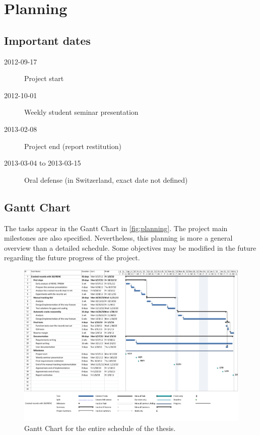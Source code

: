 \section{Planning}

\subsection{Important dates}

\begin{description}
\item[2012-09-17] Project start
\item[2012-10-01] Weekly student seminar presentation
\item[2013-02-08] Project end (report restitution)
\item[2013-03-04 to 2013-03-15] Oral defense (in Switzerland, exact date not defined)
\end{description}

\subsection{Gantt Chart}
The tasks appear in the Gantt Chart in \autoref{fig:planning}. The project main milestones are also specified. Nevertheless, this planning is more a general overview than a detailed schedule. Some objectives may be modified in the future regarding the future progress of the project.

\begin{landscape}
\begin{figure}[!h]
\centering
\includegraphics[width=0.95\linewidth]{images/planning} 
\caption{Gantt Chart for the entire schedule of the thesis.}
\label{fig:planning}
\end{figure}
\end{landscape}

